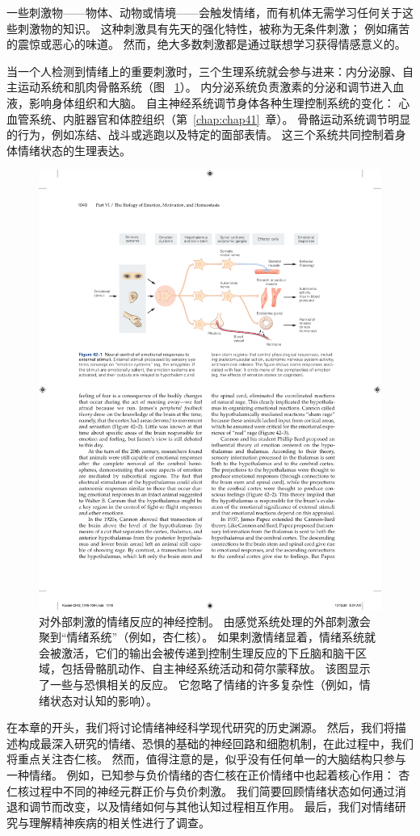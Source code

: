 一些刺激物——物体、动物或情境——会触发情绪，而有机体无需学习任何关于这些刺激物的知识。
这种刺激具有先天的强化特性，被称为无条件刺激；
例如痛苦的震惊或恶心的味道。
然而，绝大多数刺激都是通过联想学习获得情感意义的。


当一个人检测到情绪上的重要刺激时，三个生理系统就会参与进来：内分泌腺、自主运动系统和肌肉骨骼系统（图 ~\ref{fig:42_1}）。 
内分泌系统负责激素的分泌和调节进入血液，影响身体组织和大脑。
自主神经系统调节身体各种生理控制系统的变化：
心血管系统、内脏器官和体腔组织（第~\ref{chap:chap41}~章）。
骨骼运动系统调节明显的行为，例如冻结、战斗或逃跑以及特定的面部表情。
这三个系统共同控制着身体情绪状态的生理表达。


\begin{figure}[htbp]
	\centering
	\includegraphics[width=0.8\linewidth]{chap42/fig_42_1}
	\caption{对外部刺激的情绪反应的神经控制。 由感觉系统处理的外部刺激会聚到“情绪系统”（例如，杏仁核）。 如果刺激情绪显着，情绪系统就会被激活，它们的输出会被传递到控制生理反应的下丘脑和脑干区域，包括骨骼肌动作、自主神经系统活动和荷尔蒙释放。 该图显示了一些与恐惧相关的反应。 它忽略了情绪的许多复杂性（例如，情绪状态对认知的影响）。}
	\label{fig:42_1}
\end{figure}


在本章的开头，我们将讨论情绪神经科学现代研究的历史渊源。
然后，我们将描述构成最深入研究的情绪、恐惧的基础的神经回路和细胞机制，在此过程中，我们将重点关注杏仁核。
然而，值得注意的是，似乎没有任何单一的大脑结构只参与一种情绪。
例如，已知参与负价情绪的杏仁核在正价情绪中也起着核心作用：
杏仁核过程中不同的神经元群正价与负价刺激。
我们简要回顾情绪状态如何通过消退和调节而改变，以及情绪如何与其他认知过程相互作用。
最后，我们对情绪研究与理解精神疾病的相关性进行了调查。



